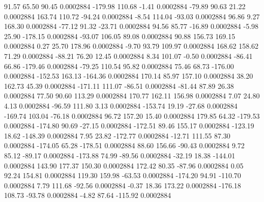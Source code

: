        91.57       65.50       90.45     0.0002884
     -179.98      110.68       -1.41     0.0002884
      -79.89       90.63       21.22     0.0002884
      163.74      110.72      -94.24     0.0002884
       -8.54      114.04      -93.03     0.0002884
       96.86        9.27      168.30     0.0002884
      -77.12       91.32      -23.71     0.0002884
       94.56       85.77      -16.89     0.0002884
       -5.98       25.90     -178.15     0.0002884
      -93.07      106.05       89.08     0.0002884
       90.88      156.73      169.15     0.0002884
        0.27       25.70      178.96     0.0002884
       -9.70       93.79      109.97     0.0002884
      168.62      158.62       71.29     0.0002884
      -88.21       76.20       12.45     0.0002884
        8.34      101.07       -0.50     0.0002884
      -86.41       66.86     -179.46     0.0002884
      -79.25      110.54       95.82     0.0002884
       75.46       68.73     -176.00     0.0002884
     -152.53      163.13     -164.36     0.0002884
      170.14       85.97      157.10     0.0002884
       38.20      162.73       45.39     0.0002884
     -171.11      111.07      -86.51     0.0002884
      -81.44       87.89       26.38     0.0002884
       77.50       90.60      113.29     0.0002884
      170.77      162.11      156.98     0.0002884
        7.07       24.80        4.13     0.0002884
      -96.59      111.80        3.13     0.0002884
     -153.74       19.19      -27.68     0.0002884
     -169.74      103.04      -76.18     0.0002884
       96.72      157.20       15.40     0.0002884
      179.85       64.32     -179.53     0.0002884
     -174.80       90.69      -27.15     0.0002884
     -172.51       89.46      155.17     0.0002884
     -123.19       18.62     -148.39     0.0002884
        7.95       23.82     -172.77     0.0002884
      -12.71      111.55       87.30     0.0002884
     -174.05       65.28     -178.51     0.0002884
       88.60      156.66      -90.43     0.0002884
        9.72       85.12      -89.17     0.0002884
     -173.88       74.99      -89.56     0.0002884
      -32.19       18.38     -144.01     0.0002884
      143.90      177.37      150.30     0.0002884
      172.42       80.35      -87.96     0.0002884
        0.05       92.24      154.81     0.0002884
      119.30      159.98      -63.53     0.0002884
     -174.20       94.91     -110.70     0.0002884
        7.79      111.68      -92.56     0.0002884
       -0.37       18.36      173.22     0.0002884
     -176.18      108.73      -93.78     0.0002884
       -4.82       87.64     -115.92     0.0002884
